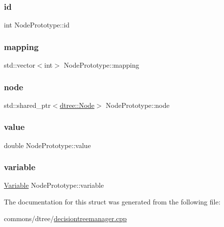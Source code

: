 \subsubsection{\texorpdfstring{id}{id}}
{\footnotesize\ttfamily int Node\+Prototype\+::id}

\mbox{\label{struct_node_prototype_a6bebc845e90ddde2ccba116a984a0b46}} 
\subsubsection{\texorpdfstring{mapping}{mapping}}
{\footnotesize\ttfamily std\+::vector$<$int$>$ Node\+Prototype\+::mapping}

\mbox{\label{struct_node_prototype_a4de54ebebfee803c7cb05a63c3cde610}} 
\subsubsection{\texorpdfstring{node}{node}}
{\footnotesize\ttfamily std\+::shared\+\_\+ptr$<$\mbox{\hyperlink{classdtree_1_1_node}{dtree\+::\+Node}}$>$ Node\+Prototype\+::node}

\mbox{\label{struct_node_prototype_a5c9384aee93f7c59d57eb796bd6c0352}} 
\subsubsection{\texorpdfstring{value}{value}}
{\footnotesize\ttfamily double Node\+Prototype\+::value}

\mbox{\label{struct_node_prototype_ae237d0ec6cb92e07b948b1f019c1d851}} 
\subsubsection{\texorpdfstring{variable}{variable}}
{\footnotesize\ttfamily \mbox{\hyperlink{namespacedtree_a79fe30831a14df904319f9e783b3189b}{Variable}} Node\+Prototype\+::variable}



The documentation for this struct was generated from the following file\+:\begin{DoxyCompactItemize}
\item 
commons/dtree/\mbox{\hyperlink{decisiontreemanager_8cpp}{decisiontreemanager.\+cpp}}\end{DoxyCompactItemize}
